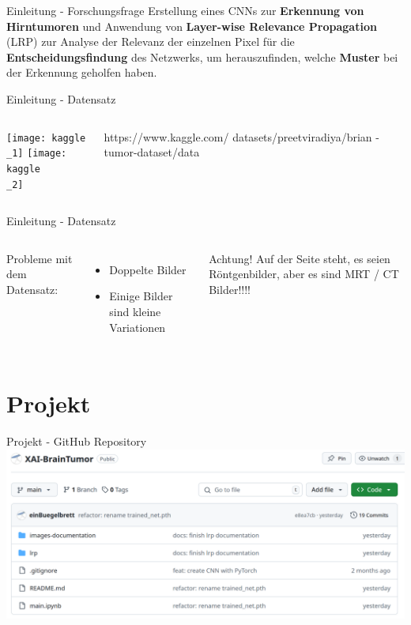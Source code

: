 \documentclass[ngerman,14pt,aspectratio=1610]{beamer}
\def\secname{Gliederung} %
\let\oldsection\section
\renewcommand{\section}[1]{
	\oldsection{#1}
	\newtotcounter{#1}
	\def\secname{#1}
}
\begin{document}
		\begin{frame}[t]{Einleitung - Forschungsfrage}
			\vspace*{\fill}
			Erstellung eines CNNs zur \textbf{Erkennung von Hirntumoren} und Anwendung von \textbf{Layer-wise Relevance Propagation} (LRP) zur Analyse der Relevanz der einzelnen Pixel für die \textbf{Entscheidungsfindung} des Netzwerks, um herauszufinden, welche \textbf{Muster} bei der Erkennung geholfen haben.
		\end{frame}
		
		\begin{frame}[t]{Einleitung - Datensatz}
			\begin{columns}[T, onlytextwidth]
				\vspace{50pt}
					\texttt{[image: kaggle\\\_1]}
					\texttt{[image: kaggle\\\_2]}
					
				\vspace{70pt}
					https://www.kaggle.com/
					datasets/preetviradiya/brian
					-tumor-dataset/data
			\end{columns}
		\end{frame}
		
		\begin{frame}[t]{Einleitung - Datensatz} 
			\vspace*{\fill}
			\begin{columns}[T, onlytextwidth]
				Probleme mit dem Datensatz:
				\begin{itemize}
					\item Doppelte Bilder
					\item Einige Bilder sind kleine Variationen
				\end{itemize}
				
				\begin{block}{Achtung!}
					Auf der Seite steht, es seien Röntgenbilder, aber es sind MRT / CT Bilder!!!!
				\end{block}
			\end{columns}
		\end{frame}
	
	\section{Projekt}
		\begin{frame}[t]{Projekt - GitHub Repository} \vspace{20pt}
			\includegraphics[width=\linewidth]{github}
		\end{frame}
		
\end{document}
